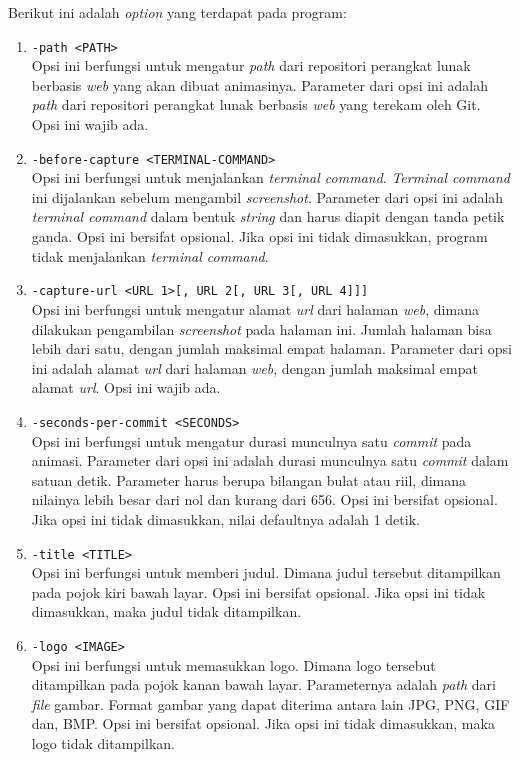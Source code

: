 Berikut ini adalah \textit{option} yang terdapat pada program:
\begin{enumerate}
\item \texttt{-path <PATH>}\\
Opsi ini berfungsi untuk mengatur \textit{path} dari repositori perangkat lunak berbasis \textit{web} yang akan dibuat animasinya. Parameter dari opsi ini adalah \textit{path} dari repositori perangkat lunak berbasis \textit{web} yang terekam oleh Git. Opsi ini wajib ada.

\item \texttt{-before-capture <TERMINAL-COMMAND>}\\
Opsi ini berfungsi untuk menjalankan \textit{terminal command}. \textit{Terminal command} ini dijalankan sebelum mengambil \textit{screenshot}. Parameter dari opsi ini adalah \textit{terminal command} dalam bentuk \textit{string} dan harus diapit dengan tanda petik ganda. Opsi ini bersifat opsional. Jika opsi ini tidak dimasukkan, program tidak menjalankan \textit{terminal command}.

\item \texttt{-capture-url <URL 1>[, URL 2[, URL 3[, URL 4]]]}\\
Opsi ini berfungsi untuk mengatur alamat \textit{url} dari halaman \textit{web}, dimana dilakukan pengambilan \textit{screenshot} pada halaman ini. Jumlah halaman bisa lebih dari satu, dengan jumlah maksimal empat halaman. Parameter dari opsi ini adalah alamat \textit{url} dari halaman \textit{web}, dengan jumlah maksimal empat alamat \textit{url}. Opsi ini wajib ada.

\item \texttt{-seconds-per-commit <SECONDS>}\\
Opsi ini berfungsi untuk mengatur durasi munculnya satu \textit{commit} pada animasi. Parameter dari opsi ini adalah durasi munculnya satu \textit{commit} dalam satuan detik. Parameter harus berupa bilangan bulat atau riil, dimana nilainya lebih besar dari nol dan kurang dari 656. Opsi ini bersifat opsional. Jika opsi ini tidak dimasukkan, nilai defaultnya adalah 1 detik.

\item \texttt{-title <TITLE>}\\
Opsi ini berfungsi untuk memberi judul. Dimana judul tersebut ditampilkan pada pojok kiri
bawah layar. Opsi ini bersifat opsional. Jika opsi ini tidak dimasukkan, maka judul tidak ditampilkan.  

\item \texttt{-logo <IMAGE>}\\
Opsi ini berfungsi untuk memasukkan logo. Dimana logo tersebut ditampilkan pada pojok kanan
bawah layar. Parameternya adalah \textit{path} dari \textit{file} gambar. Format gambar yang dapat diterima antara lain JPG, PNG, GIF dan, BMP. Opsi ini bersifat opsional. Jika opsi ini tidak dimasukkan, maka logo tidak ditampilkan.


\end{enumerate}
